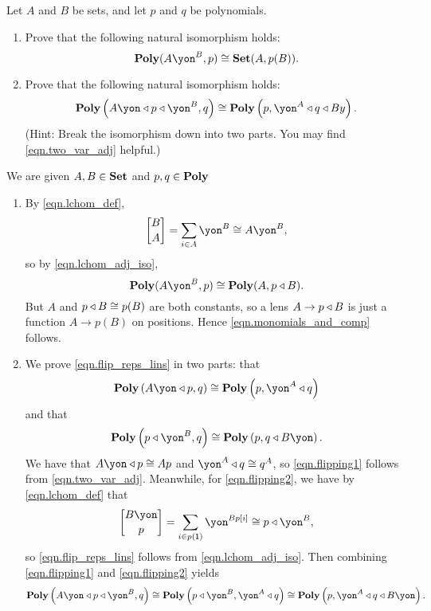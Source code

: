 \documentclass[Book-Poly]{subfiles}
\begin{document}
\begin{exercise}
Let $A$ and $B$ be sets, and let $p$ and $q$ be polynomials.
\begin{enumerate}
    \item Prove that the following natural isomorphism holds:
    \begin{equation}\label{eqn.monomials_and_comp}
    	\poly(A\yon^B,p)\iso\smset(A,p(B)).
    \end{equation}
    
    \item Prove that the following natural isomorphism holds:
    \begin{equation}\label{eqn.flip_reps_lins}
        \poly\left(A\yon\tri p\tri \yon^B, q\right)\iso\poly\left(p,\yon^A\tri q\tri By\right). %
    \end{equation}
    (Hint: Break the isomorphism down into two parts.
    You may find \eqref{eqn.two_var_adj} helpful.)
    \qedhere
\end{enumerate}
\begin{solution}
We are given $A,B\in\mathbf{Set}$ and $p,q\in\mathbf{Poly}$
\begin{enumerate}
    \item By \eqref{eqn.lchom_def},
    \[
        \lchom{B}{A}=\sum_{i\in A}\yon^{B}\iso A\yon^B,
    \]
    so by \eqref{eqn.lchom_adj_iso},
    \[
        \poly(A\yon^B,p)\iso\poly(A,p\tri B).
    \]
    But $A$ and $p\mathbin{\triangleleft} B\cong p(B)$ are both constants, so a lens $A\to p\mathbin{\triangleleft} B$ is just a function $A\to p(B)$ on positions.
    Hence \eqref{eqn.monomials_and_comp} follows.

    \item We prove \eqref{eqn.flip_reps_lins} in two parts: that
    \begin{equation} \label{eqn.flipping1}
        \poly\left(A\yon\tri p, q\right)\iso\poly\left(p,\yon^A\tri q\right)
    \end{equation}
    and that
    \begin{equation} \label{eqn.flipping2}
        \poly\left(p \tri \yon^B, q\right)\cong\poly\left(p, q\tri B\yon\right).
    \end{equation}
    We have that $A\yon \tri p \iso Ap$ and $\yon^A \tri q \iso q^A$, so \eqref{eqn.flipping1} follows from \eqref{eqn.two_var_adj}.
    Meanwhile, for \eqref{eqn.flipping2}, we have by \eqref{eqn.lchom_def} that
    \[
        \lchom{B\yon}{p}=\sum_{i\in p(\1)}\yon^{Bp[i]}\iso p\tri\yon^B,
    \]
    so \eqref{eqn.flip_reps_lins} follows from \eqref{eqn.lchom_adj_iso}.
    Then combining \eqref{eqn.flipping1} and \eqref{eqn.flipping2} yields
    \[
        \poly\left(A\yon\tri p\tri\yon^B,q\right)\iso\poly\left(p\tri\yon^B,\yon^A\tri q\right)\iso\poly\left(p,\yon^A\tri q\tri B\yon\right).
    \]
\end{enumerate}
\end{solution}
\end{exercise}
\end{document}
